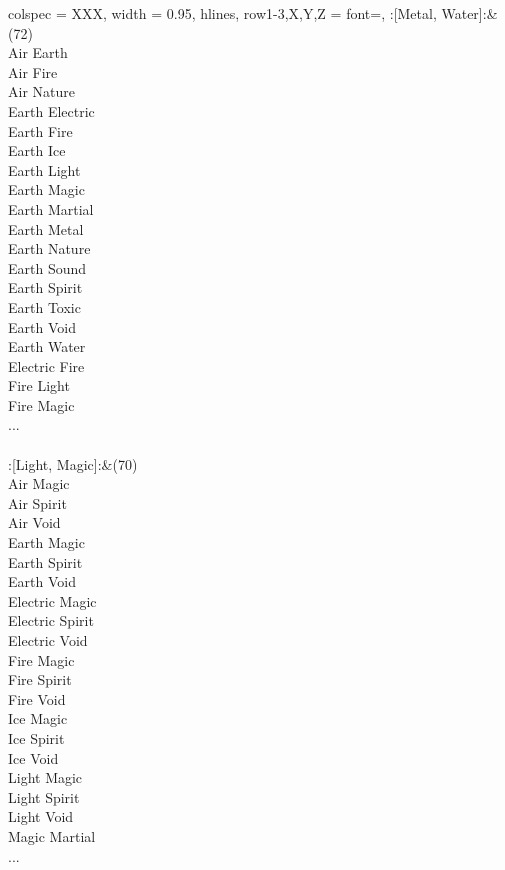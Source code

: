 \begin{longtblr}[
	caption = {2v2 Attacking Effective},
	label = {2v2-Attacking-Effective},
]{
	colspec = {XXX}, width = 0.95\linewidth,
	hlines,
	row{1-3,X,Y,Z} = {font=\bfseries},
}
	:[Metal, Water]:&{(72)\\
	Air Earth \\
	Air Fire \\
	Air Nature \\
	Earth Electric \\
	Earth Fire \\
	Earth Ice \\
	Earth Light \\
	Earth Magic \\
	Earth Martial \\
	Earth Metal \\
	Earth Nature \\
	Earth Sound \\
	Earth Spirit \\
	Earth Toxic \\
	Earth Void \\
	Earth Water \\
	Electric Fire \\
	Fire Light \\
	Fire Magic \\
	...\\
	}\\

	:[Light, Magic]:&{(70)\\
	Air Magic \\
	Air Spirit \\
	Air Void \\
	Earth Magic \\
	Earth Spirit \\
	Earth Void \\
	Electric Magic \\
	Electric Spirit \\
	Electric Void \\
	Fire Magic \\
	Fire Spirit \\
	Fire Void \\
	Ice Magic \\
	Ice Spirit \\
	Ice Void \\
	Light Magic \\
	Light Spirit \\
	Light Void \\
	Magic Martial \\
	...\\
	}\\


\end{longtblr}
